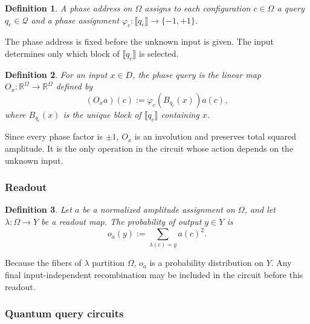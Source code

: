 \documentclass[11pt]{article}
\numberwithin{equation}{section}
\newtheorem{definition}{Definition}[section]
\theoremstyle{remark}
\begin{document}
\begin{definition}
\label{def:phase-address}
A \emph{phase address} on $\Omega$ assigns to each configuration $c\in\Omega$
a query $q_c\in\mathcal Q$ and a phase assignment
$\varphi_c:\llbracket q_c\rrbracket\to\{-1,+1\}$.
\end{definition}

The phase address is fixed before the unknown input is given. The input
determines only which block of $\llbracket q_c\rrbracket$ is selected.

\begin{definition}
\label{def:phase-query}
For an input $x\in D$, the \emph{phase query} is the linear map
$O_x:\mathbb R^\Omega\to\mathbb R^\Omega$ defined by
\begin{equation}
    (O_xa)(c):=\varphi_c(B_{q_c}(x))a(c),
\end{equation}
where $B_{q_c}(x)$ is the unique block of $\llbracket q_c\rrbracket$
containing $x$.
\end{definition}

Since every phase factor is $\pm1$, $O_x$ is an involution and preserves total
squared amplitude. It is the only operation in the circuit whose action
depends on the unknown input.

\subsubsection{Readout}
\label{subsec:quantum-readout}

\begin{definition}
\label{def:amplitude-readout}
Let $a$ be a normalized amplitude assignment on $\Omega$, and let
$\lambda:\Omega\to Y$ be a readout map. The probability of output $y\in Y$
is
\begin{equation}
    o_a(y):=\sum_{\lambda(c)=y}a(c)^2.
\end{equation}
\end{definition}

Because the fibers of $\lambda$ partition $\Omega$, $o_a$ is a probability
distribution on $Y$. Any final input-independent recombination may be
included in the circuit before this readout.

\subsubsection{Quantum query circuits}
\label{subsec:quantum-query-circuit-definition}
\end{document}
